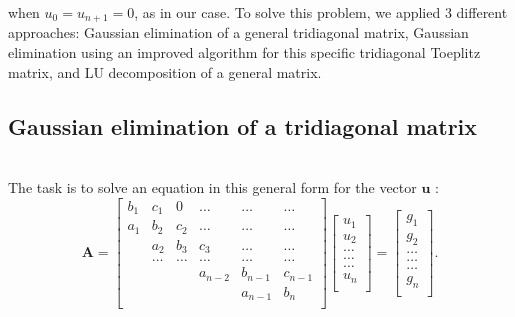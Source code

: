 \documentclass[10pt,a4paper]{article}
\begin{document}
when $u_{0}=u_{n+1}=0$, as in our case.
To solve this problem, we applied 3 different approaches: Gaussian elimination of a general tridiagonal matrix, Gaussian elimination using an improved algorithm for this specific tridiagonal Toeplitz matrix, and LU decomposition of a general matrix.

\subsection{Gaussian elimination of a tridiagonal matrix} \\
The task is to solve an equation in this general form for the vector $\mathbf{u}$ :
\[
    \mathbf{A} = \begin{bmatrix}
                           b_1& c_1 & 0 &\dots   & \dots &\dots \\
                           a_1 & b_2 & c_2 &\dots &\dots &\dots \\
                           & a_2 & b_3 & c_3 & \dots & \dots \\
                           & \dots   & \dots &\dots   &\dots & \dots \\
                           &   &  &a_{n-2}  &b_{n-1}& c_{n-1} \\
                           &    &  &   &a_{n-1} & b_n \\
                      \end{bmatrix}\begin{bmatrix}
                           u_1\\
                           u_2\\
                           \dots \\
                          \dots  \\
                          \dots \\
                           u_n\\
                      \end{bmatrix}
  =\begin{bmatrix}
                           {g}_1\\
                           {g}_2\\
                           \dots \\
                           \dots \\
                          \dots \\
                           {g}_n\\
                      \end{bmatrix}.
\]
\end{document}
